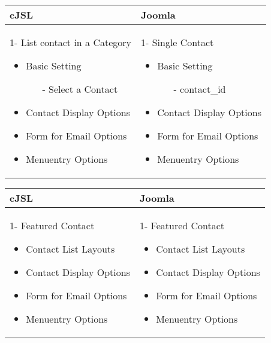 \begin{minipage}{0.7\textwidth}
\begin{tabular}{|p{} | p{}|}
\hline
\textbf{cJSL} & \textbf{Joomla} \\ 
\hline
 1- List contact in a Category
   \begin{itemize}
     \item Basic  Setting 
    		\begin{enumerate}
    			\item[-] Select a Contact
    		\end{enumerate}
 	\item Contact Display Options
 	\item Form for Email Options
 	\item Menuentry Options
  \end{itemize}
 & 
1- Single Contact
  \begin{itemize}
    \item Basic  Setting 
   		\begin{enumerate}
   			\item[-] contact\_id
   		\end{enumerate}
	\item Contact Display Options
	\item Form for Email Options
	\item Menuentry Options
 \end{itemize}
\\
\hline
\end{tabular}
\end{minipage}

\begin{minipage}{0.7\textwidth}
\begin{tabular}{|p{} | p{}|}
\hline
\textbf{cJSL} & \textbf{Joomla} \\ 
\hline
 1- Featured Contact
 \begin{itemize}
    \item Contact List Layouts
 	\item Contact Display Options
 	\item Form for Email Options
 	\item Menuentry Options
  \end{itemize}
 & 
1- Featured Contact
 \begin{itemize}
   	\item Contact List Layouts
	\item Contact Display Options
	\item Form for Email Options
	\item Menuentry Options
 \end{itemize}
\\
\hline
\end{tabular}
\end{minipage}

